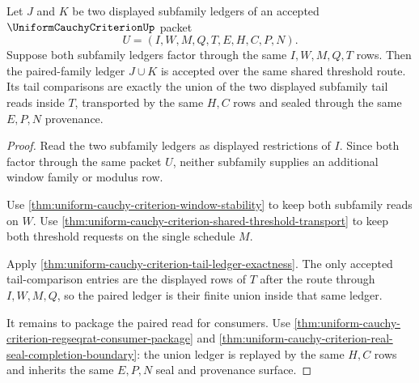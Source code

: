 \begin{theorem}
\label{thm:uniform-cauchy-criterion-paired-family-union-ledger}
Let $J$ and $K$ be two displayed subfamily ledgers of an accepted $\UniformCauchyCriterionUp$ packet
$$
U=(I,W,M,Q,T,E,H,C,P,N).
$$
Suppose both subfamily ledgers factor through the same $I,W,M,Q,T$ rows. Then the paired-family ledger $J\cup K$ is accepted over the same shared threshold route. Its tail comparisons are exactly the union of the two displayed subfamily tail reads inside $T$, transported by the same $H,C$ rows and sealed through the same $E,P,N$ provenance.
\end{theorem}
\begin{proof}
Read the two subfamily ledgers as displayed restrictions of $I$. Since both factor through the same packet $U$, neither subfamily supplies an additional window family or modulus row.

Use \autoref{thm:uniform-cauchy-criterion-window-stability} to keep both subfamily reads on $W$. Use \autoref{thm:uniform-cauchy-criterion-shared-threshold-transport} to keep both threshold requests on the single schedule $M$.

Apply \autoref{thm:uniform-cauchy-criterion-tail-ledger-exactness}. The only accepted tail-comparison entries are the displayed rows of $T$ after the route through $I,W,M,Q$, so the paired ledger is their finite union inside that same ledger.

It remains to package the paired read for consumers. Use \autoref{thm:uniform-cauchy-criterion-regseqrat-consumer-package} and \autoref{thm:uniform-cauchy-criterion-real-seal-completion-boundary}: the union ledger is replayed by the same $H,C$ rows and inherits the same $E,P,N$ seal and provenance surface.
\end{proof}

